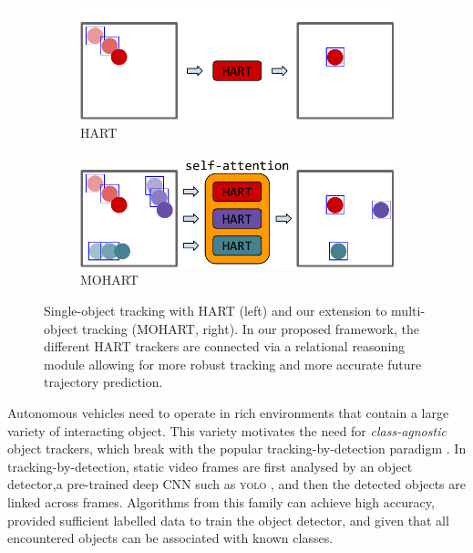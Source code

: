 \label{sec:mohart_intro}


\begin{figure}[b!]
    \centering
    \begin{subfigure}[c]{0.41\linewidth}
        \centering
        \includegraphics[width=\linewidth]{figures/MOHART/system_hart}
        \caption{HART}
    \end{subfigure}
    \hspace{20mm}
    \begin{subfigure}[c]{0.41\linewidth}
        \centering
        \includegraphics[width=\linewidth]{figures/MOHART/system_mohart}
        \caption{MOHART}
    \end{subfigure}
    \caption{
    Single-object tracking with \gls{HART} (left) and our extension to multi-object tracking (\gls{MOHART}, right). In our proposed framework, the different \gls{HART} trackers are connected via a relational reasoning module allowing for more robust tracking and more accurate future trajectory prediction.
    }
    \label{fig:teaser}
\end{figure}

Autonomous vehicles need to operate in rich environments that contain a large variety of interacting object. 
%
This variety motivates the need for \emph{class-agnostic} object trackers, which break with the popular tracking-by-detection paradigm \cite{Zhang2008,Milan2014,Bae2017confidence, Keuper2018motion}. 
%
In tracking-by-detection, static video frames are first analysed by an object detector,\eg a pre-trained deep \gls{CNN} such as \textsc{yolo} \citep{Redmon15}, and then the detected objects are linked across frames. 
%
Algorithms from this family can achieve high accuracy, provided sufficient labelled data to train the object detector, and given that all encountered objects can be associated with known classes. 
%

